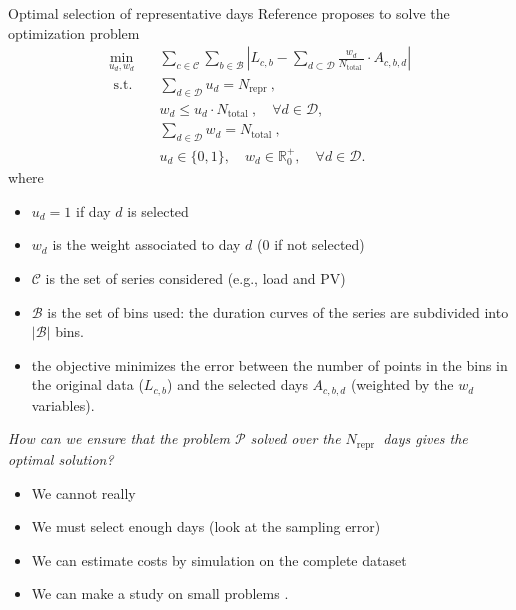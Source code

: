 \begin{frame}[allowframebreaks]{Optimal selection of representative days}
Reference \cite{poncelet2016selecting} proposes to solve the optimization problem 
\begin{subequations}
\begin{align}
\min_{u_d, w_d} \quad & \sum_{c \in \mathcal{C}} \sum_{b \in \mathcal{B}} \left|L_{c, b}-\sum_{d \subset \mathcal{D}} \frac{w_d}{N_{\text {total }}} \cdot A_{c, b, d}\right| \\
\text { s.t. } & \sum_{d \in \mathcal{D}} u_d=N_{\text {repr }}, \\
 & w_d \leq u_d \cdot N_{\text {total }}, \quad \forall d \in \mathcal{D}, \\
 &\sum_{d \in \mathcal{D}} w_d=N_{\text {total }}, \\
 &u_d \in\{0,1\}, \quad w_d \in \mathbb{R}_0^{+}, \quad \forall d \in \mathcal{D} .
\end{align}
\end{subequations}
where 
\begin{itemize}
    \item $u_d=1$ if day $d$ is selected
    \item $w_d$  is the weight associated to day $d$ ($0$ if not  selected)
    \item $\mathcal{C}$ is the set of series considered (e.g., load and PV)
    \item $\mathcal{B}$ is the set of bins used: the duration curves of the series are subdivided into $|\mathcal{B}|$ bins.
    \item the objective minimizes the error between the number of points in the bins in the original data ($L_{c,b}$) and the selected days $A_{c,b,d}$ (weighted by the $w_d$ variables).
\end{itemize}

\newpage

\textit{How can we ensure that the problem $\mathcal{P}$ solved over the $N_{\text {repr }}$ days gives the optimal solution?}     

\begin{itemize}
    \item We cannot really 
    \item We must select enough days (look at the sampling error)
    \item We can estimate costs by simulation on the complete dataset
    \item We can make a study on small problems \cite{dakir2020number}.
\end{itemize}
\end{frame}


